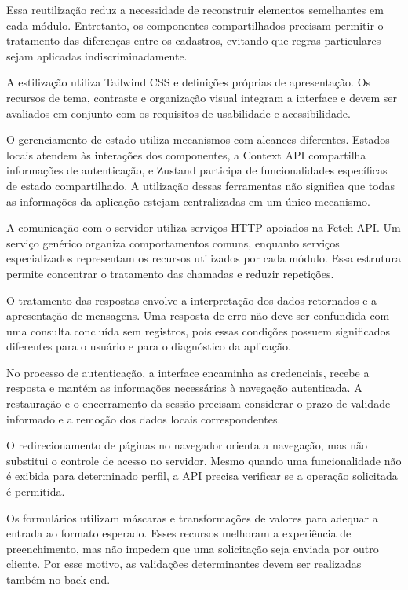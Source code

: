 Essa reutilização reduz a necessidade de reconstruir elementos semelhantes em cada módulo. Entretanto, os componentes compartilhados precisam permitir o tratamento das diferenças entre os cadastros, evitando que regras particulares sejam aplicadas indiscriminadamente.

A estilização utiliza Tailwind CSS e definições próprias de apresentação. Os recursos de tema, contraste e organização visual integram a interface e devem ser avaliados em conjunto com os requisitos de usabilidade e acessibilidade.

O gerenciamento de estado utiliza mecanismos com alcances diferentes. Estados locais atendem às interações dos componentes, a Context API compartilha informações de autenticação, e Zustand participa de funcionalidades específicas de estado compartilhado. A utilização dessas ferramentas não significa que todas as informações da aplicação estejam centralizadas em um único mecanismo.

A comunicação com o servidor utiliza serviços HTTP apoiados na Fetch API. Um serviço genérico organiza comportamentos comuns, enquanto serviços especializados representam os recursos utilizados por cada módulo. Essa estrutura permite concentrar o tratamento das chamadas e reduzir repetições.

O tratamento das respostas envolve a interpretação dos dados retornados e a apresentação de mensagens. Uma resposta de erro não deve ser confundida com uma consulta concluída sem registros, pois essas condições possuem significados diferentes para o usuário e para o diagnóstico da aplicação.

No processo de autenticação, a interface encaminha as credenciais, recebe a resposta e mantém as informações necessárias à navegação autenticada. A restauração e o encerramento da sessão precisam considerar o prazo de validade informado e a remoção dos dados locais correspondentes.

O redirecionamento de páginas no navegador orienta a navegação, mas não substitui o controle de acesso no servidor. Mesmo quando uma funcionalidade não é exibida para determinado perfil, a API precisa verificar se a operação solicitada é permitida.

Os formulários utilizam máscaras e transformações de valores para adequar a entrada ao formato esperado. Esses recursos melhoram a experiência de preenchimento, mas não impedem que uma solicitação seja enviada por outro cliente. Por esse motivo, as validações determinantes devem ser realizadas também no back-end.

